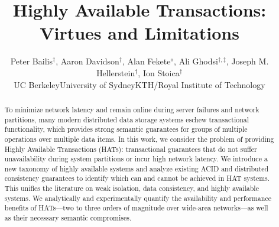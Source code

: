 \documentclass{vldb}
\theoremstyle{definition}
\begin{document}

\title{Highly Available Transactions: Virtues and Limitations}
{\author{Peter Bailis{\fontsize{12}{14}$^\dagger$}, Aaron Davidson{\fontsize{12}{14}$^\dagger$}, Alan Fekete{\fontsize{12}{14}$^\diamond$}, Ali Ghodsi{\fontsize{12}{14}$^{\dagger,\ddagger}$}, Joseph M. Hellerstein{\fontsize{12}{14}$^\dagger$}, Ion Stoica{\fontsize{12}{14}$^\dagger$}\\{\affaddr{\fontsize{12}{14}$^\dagger$}\hspace{.5mm}UC Berkeley\hspace{4mm}{\fontsize{12}{14}$^\diamond$}\hspace{.5mm}University of Sydney\hspace{4mm}{\fontsize{12}{14}$^\ddagger$}\hspace{.5mm}KTH/Royal Institute of Technology}}}
\maketitle

\begin{abstract}
\noindent To minimize network latency and remain online during server
failures and network partitions, many modern distributed data storage
systems eschew transactional functionality, which provides strong
semantic guarantees for groups of multiple operations over multiple
data items. In this work, we consider the problem of providing Highly
Available Transactions (HATs): transactional guarantees that do not
suffer unavailability during system partitions or incur high network
latency.  We introduce a new taxonomy of highly available systems and
analyze existing ACID and distributed consistency guarantees to
identify which can and cannot be achieved in HAT systems. This unifies
the literature on weak isolation, data consistency, and highly
available systems. We analytically and experimentally quantify the
availability and performance benefits of HATs---two to three orders of
magnitude over wide-area networks---as well as their necessary
semantic compromises.
\end{abstract}\vspace{-.5em}










\end{document}
